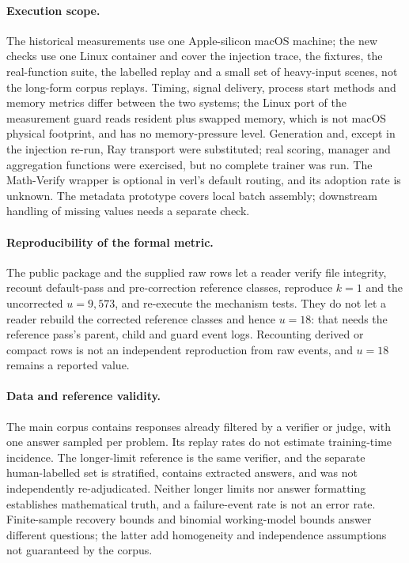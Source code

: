 \documentclass[10pt,a4paper]{article}
\begin{document}
\paragraph{Execution scope.}
The historical measurements use one Apple-silicon macOS machine; the new
checks use one Linux container and cover the injection trace, the fixtures,
the real-function suite, the labelled replay and a small set of heavy-input
scenes, not the long-form corpus replays. Timing, signal delivery, process
start methods and memory metrics differ between the two systems; the Linux
port of the measurement guard reads resident plus swapped memory, which is
not macOS physical footprint, and has no memory-pressure level.
Generation and, except in the injection re-run, Ray transport were
substituted; real scoring, manager and aggregation functions were exercised,
but no complete trainer was run. The Math-Verify wrapper is optional in verl's default routing, and
its adoption rate is unknown. The metadata prototype covers local batch
assembly; downstream handling of missing values needs a separate check.

\paragraph{Reproducibility of the formal metric.}
The public package and the supplied raw rows let a reader verify file
integrity, recount default-pass and pre-correction reference classes,
reproduce $k=1$ and the uncorrected $u=9{,}573$, and re-execute the mechanism
tests. They do not let a reader rebuild the corrected reference classes and
hence $u=18$: that needs the reference pass's parent, child and guard event
logs. Recounting derived or compact rows is not an independent reproduction
from raw events, and $u=18$ remains a reported value.

\paragraph{Data and reference validity.}
The main corpus contains responses already filtered by a verifier or
judge, with one answer sampled per problem. Its replay rates do not
estimate training-time incidence. The longer-limit reference is the
same verifier, and the separate human-labelled set is stratified,
contains extracted answers, and was not independently re-adjudicated.
Neither longer limits nor answer formatting establishes mathematical
truth, and a failure-event rate is not an error rate. Finite-sample recovery bounds and binomial working-model bounds
answer different questions; the latter add homogeneity and independence
assumptions not guaranteed by the corpus.
\end{document}
